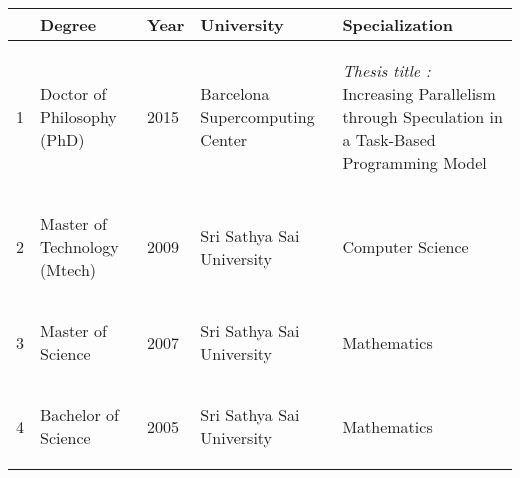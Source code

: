 \documentclass[margin]{res}
\begin{document}
\begin{resume}
    \begin{center}
        \begin{tabular} {|p{1cm} |p{2cm}|p{1cm}|p{3cm}|p{4cm}|  }
            \hline
              & Degree & Year & University & Specialization \\ \hline
            \hline
%
            \begin{center} 1 \end{center} & \begin{center} Doctor of Philosophy (PhD) \end{center} & \begin{center} 2015 \end{center} & \begin{center} Barcelona Supercomputing Center \end{center} & \begin{center} {\it Thesis title :} Increasing Parallelism through Speculation in a Task-Based Programming Model \end{center} \\
            \hline
%
            \begin{center} 2 \end{center} & \begin{center} Master of Technology (Mtech) \end{center} & \begin{center} 2009 \end{center} & \begin{center} Sri Sathya Sai University \end{center} & \begin{center} Computer Science \end{center} \\
            \hline
%
            \begin{center} 3 \end{center} & \begin{center} Master of Science \end{center} & \begin{center} 2007 \end{center} & \begin{center} Sri Sathya Sai University \end{center} & \begin{center} Mathematics \end{center} \\
            \hline
%
            \begin{center} 4 \end{center} & \begin{center} Bachelor of Science \end{center} & \begin{center} 2005 \end{center} & \begin{center} Sri Sathya Sai University \end{center} & \begin{center} Mathematics \end{center} \\
            \hline


\end{tabular}
\end{center}
\end{resume}
\end{document}
